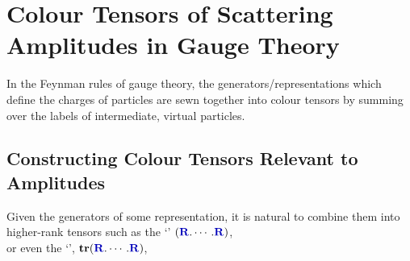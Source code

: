 \documentclass[12pt,a4paper]{article}\let\ifpdf\relax
\begin{document}
\newpage
\section{Colour Tensors of Scattering Amplitudes in Gauge Theory}\label{sec:colourInGaugeTheory}\vspace{-4pt}

In the Feynman rules of gauge theory, the generators/representations which define the charges of particles are sewn together into colour tensors by summing over the labels of intermediate, virtual particles. 



\subsection{Constructing Colour Tensors Relevant to Amplitudes}\label{subsec:constructing_tensors}\vspace{-4pt}

Given the generators of some representation, it is natural to combine them into higher-rank tensors such as the `' $(\mathbf{\b{R}}.\cdots.\mathbf{\b{R}})$,
%
\mathematicaBox{
\mathematicaSequence[1]{egRep=\funL[0]{fundamentalRep}\brace{\algL{a}\brace{6}}\\%
\{\funL[1]{nice}@\%,\funL[1]{drawTensors}@\%,\funL[1]{byteCount}@\%\}}{\fig[-4pt]{1}{fundamentalRep_a6_nice}\vspace{-6pt}}
\mathematicaSequence{\funL[0]{dotPower}\brace{egRep,4}\\[-10pt]}{\fig[-4pt]{1}{dotPower_a6_4}\vspace{-4pt}}
\mathematicaSequence{\{\funL[1]{nice}@\%,\funL[1]{drawTensors}@\%\}}{\fig[-4pt]{1}{dotPower_a6_4_nice}\vspace{-4pt}}
\mathematicaSequence{\funL[1]{byteCount}@\%\%}{\fig[-4pt]{1}{dotPower_a6_4_bytes}\vspace{-2pt}}
}~\\[-2pt]
%
or even the `', $\mathbf{tr}(\mathbf{\b{R}}.\cdots.\mathbf{\b{R}})$, 
%
~\\[4pt]
\end{document}
